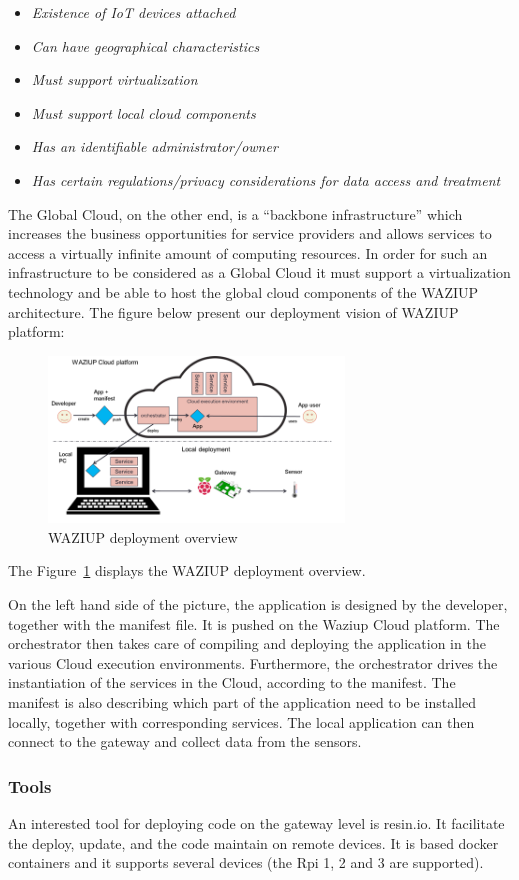 \begin{itemize}
    \item \emph{Existence of IoT devices attached}
    \item \emph{Can have geographical characteristics}
    \item \emph{Must support virtualization}
    \item \emph{Must support local cloud components}
    \item \emph{Has an identifiable administrator/owner}
    \item \emph{Has certain regulations/privacy considerations for data access and treatment}
\end{itemize}

The Global Cloud, on the other end, is a “backbone infrastructure” which increases the business opportunities for service providers and allows services to access a virtually infinite amount of computing resources. 
In order for such an infrastructure to be considered as a Global Cloud it must support a virtualization technology and be able to host the global cloud components of the WAZIUP architecture.
The figure below present our deployment vision of WAZIUP platform:

\begin{figure}[h!]
\centering
\includegraphics[width=0.7\textwidth]{figs/deploy.png}
\caption{WAZIUP deployment overview}
\label{fig:func}
\end{figure}

The Figure~\ref{fig:func} displays the WAZIUP deployment overview.

On the left hand side of the picture, the application is designed by the developer, together with the manifest file. 
It is pushed on the Waziup Cloud platform. The orchestrator then takes care of compiling and deploying the application in the various Cloud execution environments. 
Furthermore, the orchestrator drives the instantiation of the services in the Cloud, according to the manifest. 
The manifest is also describing which part of the application need to be installed locally, together with corresponding services. 
The local application can then connect to the gateway and collect data from the sensors.

\subsubsection{Tools}
An interested tool for deploying code on the gateway level is resin.io.
It facilitate the deploy, update, and the code maintain on remote devices. 
It is based docker containers and it supports several devices (the Rpi 1, 2 and 3 are supported).


